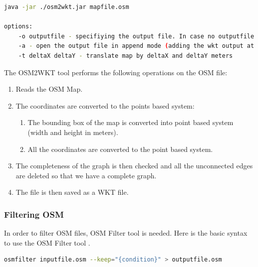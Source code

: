 \begin{lstlisting}[language=bash]
java -jar ./osm2wkt.jar mapfile.osm

options:
	-o outputfile - specifiying the output file. In case no outputfile is mentioned, .wkt is appended to the name of input file.
	-a - open the output file in append mode (adding the wkt output at the end of the output file)
	-t deltaX deltaY - translate map by deltaX and deltaY meters
\end{lstlisting}

\vspace{8mm}
The OSM2WKT tool \cite{mayer2010osm} performs the following operations on the OSM file:
	\begin{enumerate}
 	 \item Reads the OSM Map.
   	 \item The coordinates are converted to the points based system:
   	 	\begin{enumerate}
	   	 	\item The bounding box of the map is converted into point based system (width and height in meters).
   		 	\item All the coordinates are converted to the point based system.
   		 \end{enumerate}
   	 \item The completeness of the graph is then checked and all the unconnected edges are deleted so that we have a complete graph.
   	 \item The file is then saved as a WKT file.
	\end{enumerate}

\newpage
\subsubsection{Filtering OSM}
In order to filter OSM files, OSM Filter tool \cite{osm-filter} is needed. Here is the basic syntax to use the OSM Filter tool \cite{osm-filter}.
\vspace{2mm}
\begin{lstlisting}[language=bash]
	osmfilter inputfile.osm --keep="{condition}" > outputfile.osm
\end{lstlisting}
\vspace{5mm}

